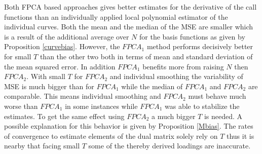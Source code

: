 %

Both FPCA based approaches gives better estimates for the derivative of the call functions than an individually applied local polynomial estimator of the individual curves. Both the mean and the median of the MSE are smaller which is a result of the additional average over $N$ for the basis functions as given by Proposition \ref{curvebias}. However, the $FPCA_1$ method performs decisively better for small $T$ than the other two both in terms of mean and standard deviation of the mean squared error. 
In addition  $FPCA_1$ benefits more from raising $N$ then $FPCA_2$. With small $T$ for $FPCA_2$ and individual smoothing the variability of MSE is much bigger than for $FPCA_1$ while the median of $FPCA_1$ and $FPCA_2$ are comparable. This means individual smoothing and $FPCA_2$  must behave much worse than $FPCA_1$ in some instances while $FPCA_1$ was able to stabilize the estimates. To get the same effect using $FPCA_2$ a much bigger $T$ is needed. A possible explanation for this behavior is given by Proposition \ref{Mbias}. The rates of convergence to estimate elements of the dual matrix solely rely on $T$ thus it is nearby that facing small $T$ some of the thereby derived loadings are inaccurate.





